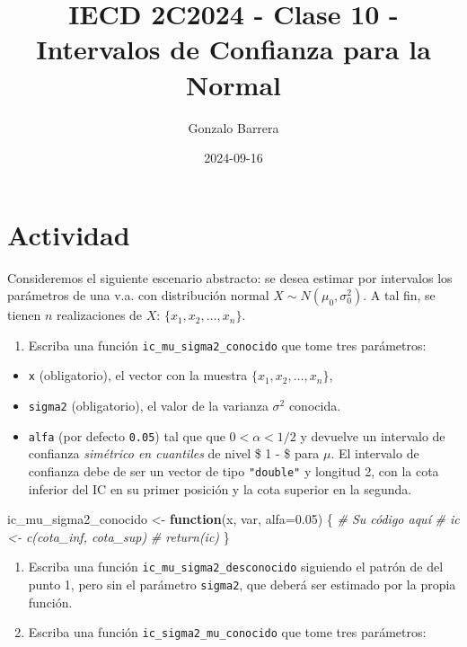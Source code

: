 \documentclass[
]{article}
\title{IECD 2C2024 - Clase 10 - Intervalos de Confianza para la Normal}
\author{Gonzalo Barrera}
\date{2024-09-16}
\newenvironment{Shaded}{\begin{snugshade}}{\end{snugshade}}
\newcommand{\AttributeTok}[1]{\textcolor[rgb]{0.13,0.29,0.53}{#1}}
\newcommand{\CommentTok}[1]{\textcolor[rgb]{0.56,0.35,0.01}{\textit{#1}}}
\newcommand{\ControlFlowTok}[1]{\textcolor[rgb]{0.13,0.29,0.53}{\textbf{#1}}}
\newcommand{\FloatTok}[1]{\textcolor[rgb]{0.00,0.00,0.81}{#1}}
\newcommand{\NormalTok}[1]{#1}
\newcommand{\OtherTok}[1]{\textcolor[rgb]{0.56,0.35,0.01}{#1}}
\providecommand{\tightlist}{%
  \setlength{\itemsep}{0pt}\setlength{\parskip}{0pt}}
\begin{document}
\maketitle

\hypertarget{actividad}{%
\section{Actividad}\label{actividad}}

Consideremos el siguiente escenario abstracto: se desea estimar por
intervalos los parámetros de una v.a. con distribución normal
\(X \sim N(\mu_0, \sigma^2_0)\). A tal fin, se tienen \(n\)
realizaciones de \(X\): \(\{ x_1, x_2, \dots, x_n \}\).

\begin{enumerate}
\def\labelenumi{\arabic{enumi}.}
\tightlist
\item
  Escriba una función \texttt{ic\_mu\_sigma2\_conocido} que tome tres
  parámetros:
\end{enumerate}

\begin{itemize}
\tightlist
\item
  \texttt{x} (obligatorio), el vector con la muestra
  \(\{ x_1, x_2, \dots, x_n \}\),
\item
  \texttt{sigma2} (obligatorio), el valor de la varianza \(\sigma^2\)
  conocida.
\item
  \texttt{alfa} (por defecto \texttt{0.05}) tal que que
  \(0 < \alpha < 1/2\) y devuelve un intervalo de confianza
  \emph{simétrico en cuantiles} de nivel \$ 1 - \alpha\$ para \(\mu\).
  El intervalo de confianza debe de ser un vector de tipo
  \texttt{"double"} y longitud 2, con la cota inferior del IC en su
  primer posición y la cota superior en la segunda.
\end{itemize}

\begin{Shaded}
\begin{Highlighting}[]
\NormalTok{ic\_mu\_sigma2\_conocido }\OtherTok{\textless{}{-}} \ControlFlowTok{function}\NormalTok{(x, var, }\AttributeTok{alfa=}\FloatTok{0.05}\NormalTok{) \{}
  \CommentTok{\# Su código aquí}
  \CommentTok{\# ic \textless{}{-} c(cota\_inf, cota\_sup)}
  \CommentTok{\# return(ic)}
\NormalTok{\}}
\end{Highlighting}
\end{Shaded}

\begin{enumerate}
\def\labelenumi{\arabic{enumi}.}
\setcounter{enumi}{1}
\item
  Escriba una función \texttt{ic\_mu\_sigma2\_desconocido} siguiendo el
  patrón de del punto 1, pero sin el parámetro \texttt{sigma2}, que
  deberá ser estimado por la propia función.
\item
  Escriba una función \texttt{ic\_sigma2\_mu\_conocido} que tome tres
  parámetros:
\end{enumerate}
\end{document}
